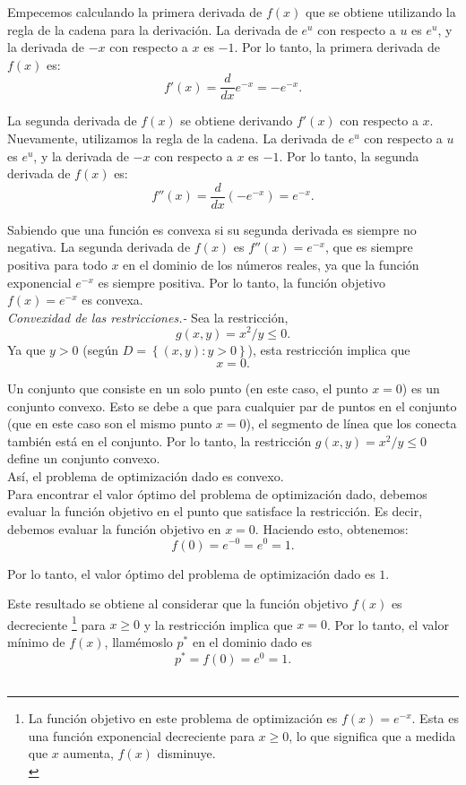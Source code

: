 \begin{enumerate}
\begin{enumerate}[\bfseries (a)]
	    Empecemos calculando la primera derivada de $f(x)$ que se obtiene utilizando la regla de la cadena para la derivación. La derivada de $e^u$ con respecto a $u$ es $e^u$, y la derivada de $-x$ con respecto a $x$ es $-1$. Por lo tanto, la primera derivada de $f(x)$ es:
	    $$f'(x) = \frac{d}{dx} e^{-x} = -e^{-x}.$$

	    La segunda derivada de $f(x)$ se obtiene derivando $f'(x)$ con respecto a $x$. Nuevamente, utilizamos la regla de la cadena. La derivada de $e^u$ con respecto a $u$ es $e^u$, y la derivada de $-x$ con respecto a $x$ es $-1$. Por lo tanto, la segunda derivada de $f(x)$ es:
	    $$f''(x) = \frac{d}{dx} (-e^{-x}) = e^{-x}.$$

	    Sabiendo que una función es convexa si su segunda derivada es siempre no negativa. La segunda derivada de $f(x)$ es $f''(x) = e^{-x}$, que es siempre positiva para todo $x$ en el dominio de los números reales, ya que la función exponencial $e^{-x}$ es siempre positiva. Por lo tanto, la función objetivo $f(x) = e^{-x}$ es convexa.\\

	    \textit{Convexidad de las restricciones.-} Sea la restricción,
	    $$g(x,y) = x^2/y \leq 0.$$ 
	     Ya que $y > 0$ (según $D=\left\{(x,y):y>0\right\}$), esta restricción implica que 
	     $$x = 0.$$ 

	    Un conjunto que consiste en un solo punto (en este caso, el punto $x = 0$) es un conjunto convexo. Esto se debe a que para cualquier par de puntos en el conjunto (que en este caso son el mismo punto $x = 0$), el segmento de línea que los conecta también está en el conjunto. Por lo tanto, la restricción $g(x,y) = x^2/y \leq 0$ define un conjunto convexo.\\

	    Así, el problema de optimización dado es convexo.\\

	    Para encontrar el valor óptimo del problema de optimización dado, debemos evaluar la función objetivo en el punto que satisface la restricción. Es decir, debemos evaluar la función objetivo en $x = 0$. Haciendo esto, obtenemos:
	    $$f(0) = e^{-0} = e^0 = 1.$$

	    Por lo tanto, el valor óptimo del problema de optimización dado es $1$.

	    Este resultado se obtiene al considerar que la función objetivo $f(x)$ es decreciente
	    \footnote{
		La función objetivo en este problema de optimización es $f(x) = e^{-x}$. Esta es una función exponencial decreciente para $x \geq 0$, lo que significa que a medida que $x$ aumenta, $f(x)$ disminuye.\\
	    }
	    para $x \geq 0$ y la restricción implica que $x = 0$. Por lo tanto, el valor mínimo de $f(x)$, llamémoslo $p^*$ en el dominio dado es 
	    $$p^*=f(0) = e^0 = 1.$$\\



\end{enumerate}
\end{enumerate}
